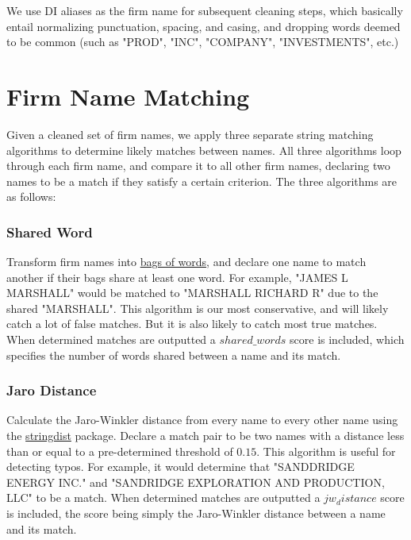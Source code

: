 \documentclass{article}
\begin{document}
We use DI aliases as the firm name for subsequent cleaning steps, which basically entail normalizing punctuation, spacing, and casing, and dropping words deemed to be common (such as "PROD", "INC", "COMPANY", "INVESTMENTS", etc.) 

\section{Firm Name Matching}

Given a cleaned set of firm names, we apply three separate string matching algorithms to determine likely matches between names. All three algorithms loop through each firm name, and compare it to all other firm names, declaring two names to be a match if they satisfy a certain criterion. The three algorithms are as follows:
\subsubsection{Shared Word}
Transform firm names into \href{https://en.wikipedia.org/wiki/Bag-of-words_model}{bags of words}, and declare one name to match another if their bags share at least one word. For example, "JAMES L MARSHALL" would be matched to "MARSHALL RICHARD R" due to the shared "MARSHALL". This algorithm is our most conservative, and will likely catch a lot of false matches. But it is also likely to catch most true matches. When determined matches are outputted a $shared\_words$ score is included, which specifies the number of words shared between a name and its match. 
\subsubsection{Jaro Distance}
Calculate the Jaro-Winkler distance from every name to every other name using the \href{https://cra-n.r-project.org/web/packages/stringdist/stringdist.pdf}{stringdist} package. Declare a match pair to be two names with a distance less than or equal to a pre-determined threshold of $0.15$. This algorithm is useful for detecting typos. For example, it would determine that "SANDDRIDGE ENERGY INC." and "SANDRIDGE EXPLORATION AND PRODUCTION, LLC" to be a match. When determined matches are outputted a $jw_distance$ score is included, the score being simply the Jaro-Winkler distance between a name and its match. 
\end{document}
